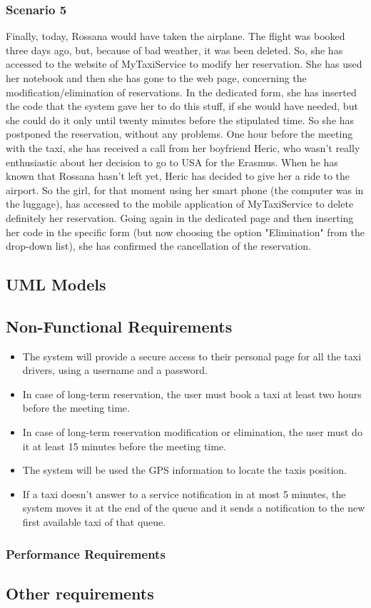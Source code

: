 		\subsubsection{Scenario 5}
		Finally, today, Rossana would have taken the airplane. The flight was booked three days ago, but, because of bad weather, it was been deleted. So, she has accessed to the website of MyTaxiService to modify her reservation. She has used her notebook and then she has gone to the web page, concerning the modification/elimination of reservations. In the dedicated form, she has inserted the code that the system gave her to do this stuff, if she would have needed, but she could do it only until twenty minutes before the stipulated time. So she has postponed the reservation, without any problems.
		One hour before the meeting with the taxi, she has received a call from her boyfriend Heric, who wasn't really enthusiastic about her decision to go to USA for the Erasmus. When he has known that Rossana hasn't left yet, Heric has decided to give her a ride to the airport. So the girl, for that moment using her smart phone (the computer was in the luggage), has accessed to the mobile application of MyTaxiService to delete definitely her reservation. Going again in the dedicated page and then inserting her code in the specific form (but now choosing the option "Elimination" from the drop-down list), she has confirmed the cancellation of the reservation. 
	\newpage
	\subsection{UML Models}
		
		\newpage
		
		\newpage
		
		
	\subsection{Non-Functional Requirements}
		\begin{itemize}
		\item The system will provide a secure access to their personal page for all the taxi drivers, using a username and a password.
		\item In case of long-term reservation, the user must book a taxi at least two hours before the meeting time.
		\item In case of long-term reservation modification or elimination, the user must do it at least 15 minutes before the meeting time.
	    \item The system will be used the GPS information to locate the taxis position.
	    \item If a taxi doesn't answer to a service notification in at most 5 minutes, the system moves it at the end of the queue and it sends a notification to the new first available taxi of that queue. 
		\end{itemize}
		\subsubsection{Performance Requirements}
	\subsection{Other requirements}